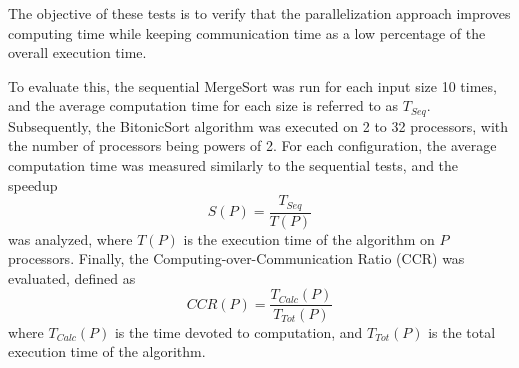 \documentclass[12pt,conference]{ieeeconf} %
\begin{document}
The objective of these tests is to verify that the parallelization approach improves computing time while keeping communication time as a low percentage of the overall execution time. 
\par
To evaluate this, the sequential MergeSort was run for each input size 10 times, and the average computation time for each size is referred to as $T_{Seq}$.
Subsequently, the BitonicSort algorithm was executed on 2 to 32 processors, with the number of processors being powers of 2. For each configuration, the average computation time was measured similarly to the sequential tests, and the speedup$$S(P) = \frac{T_{Seq}}{T(P)}$$ was analyzed, where $T(P)$ is the execution time of the algorithm on $P$ processors.
Finally, the Computing-over-Communication Ratio (CCR) was evaluated, defined as $$CCR(P) = \frac{T_{Calc}(P)}{T_{Tot}(P)}$$ where $T_{Calc}(P)$ is the time devoted to computation, and $T_{Tot}(P)$ is the total execution time of the algorithm.

\addtolength{\textheight}{-12cm}   %

\vspace{\fill}
\printbibliography
\end{document}
